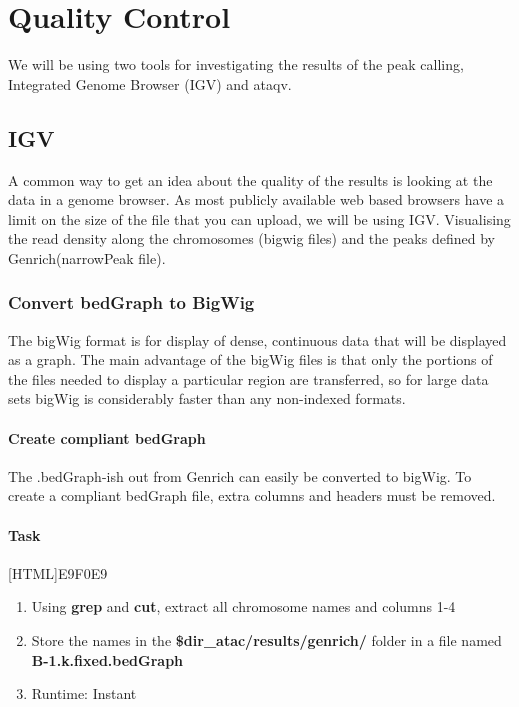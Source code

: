 \documentclass[12pt]{article}
\begin{document}
	\section{Quality Control}
		We will be using two tools for investigating the results of the peak calling, Integrated Genome Browser (IGV) and ataqv.
		
		\subsection{IGV}
			A common way to get an idea about the quality of the results is looking at the data in a genome browser. 
			As most publicly available web based browsers have a limit on the size of the file that you can upload, we will be using IGV.
			Visualising the read density along the chromosomes (bigwig files) and the peaks defined by Genrich(narrowPeak file).
		
			\subsubsection{Convert bedGraph to BigWig}
				The bigWig format is for display of dense, continuous data that will be displayed as a graph. 
				The main advantage of the bigWig files is that only the portions of the files needed to display a particular region are transferred, so for large data sets bigWig is considerably faster than any non-indexed formats.


			\paragraph{Create compliant bedGraph }
				The  .bedGraph-ish out from Genrich can easily be converted to bigWig. 
				To create a compliant bedGraph file, extra columns and headers must be removed. 
				
				\paragraph{Task}
					
					[HTML]{E9F0E9}{\parbox{\linewidth}{%
						\begin{enumerate}
							\item Using \textbf{grep} and \textbf{cut}, extract all chromosome names and columns 1-4
							\item Store the names in the \textbf{\$dir\_atac/results/genrich/} folder in a file named \textbf{B-1.k.fixed.bedGraph}
							\item Runtime: Instant
						\end{enumerate}
					}}
				
\end{document}

